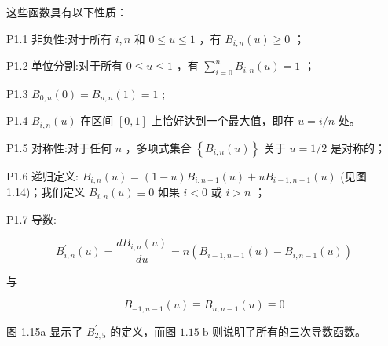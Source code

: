 \documentclass[../main.tex]{subfiles}
\begin{document}
这些函数具有以下性质：

P1.1 非负性:对于所有 \(i,n\) 和 \(0 \leq  u \leq  1\) ，有 \({B}_{i,n}\left( u\right)  \geq  0\) ；



P1.2 单位分割:对于所有 \(0 \leq  u \leq  1\) ，有 \(\mathop{\sum }\limits_{{i = 0}}^{n}{B}_{i,n}\left( u\right)  = 1\) ；

P1.3 \({B}_{0,n}\left( 0\right)  = {B}_{n,n}\left( 1\right)  = 1\) ;

P1.4 \({B}_{i,n}\left( u\right)\) 在区间 \(\left\lbrack  {0,1}\right\rbrack\) 上恰好达到一个最大值，即在 \(u = i/n\) 处。

P1.5 对称性:对于任何 \(n\) ，多项式集合 \(\left\{  {{B}_{i,n}\left( u\right) }\right\}\) 关于 \(u = 1/2\) 是对称的；



\noindent\begin{minipage}{\linewidth}
P1.6 递归定义: \({B}_{i,n}\left( u\right)  = \left( {1 - u}\right) {B}_{i,n - 1}\left( u\right)  + u{B}_{i - 1,n - 1}\left( u\right)\) (见图 1.14)；我们定义 \({B}_{i,n}\left( u\right)  \equiv  0\) 如果 \(i < 0\) 或 \(i > n\) ；

\begin{center}
\begin{minipage}{11cm}
\centering
{}
\captionsetup{font=small,skip=6pt,justification=centering}
\end{minipage}
\end{center}
\end{minipage}
\par\medskip

\noindent\begin{minipage}{\linewidth}
P1.7 导数:

\[
{B}_{i,n}^{\prime }\left( u\right)  = \frac{d{B}_{i,n}\left( u\right) }{du} = n\left( {{B}_{i - 1,n - 1}\left( u\right)  - {B}_{i,n - 1}\left( u\right) }\right)
\]

与

\[
{B}_{-1,n - 1}\left( u\right)  \equiv  {B}_{n,n - 1}\left( u\right)  \equiv  0
\]

图 1.15a 显示了 \({B}_{2,5}^{\prime }\) 的定义，而图 \({1.15}\mathrm{\;b}\) 则说明了所有的三次导数函数。

\begin{center}
\begin{minipage}{15.8cm}
\centering
{}
\captionsetup{font=small,skip=6pt,justification=centering}
\end{minipage}
\end{center}
\end{minipage}
\par\medskip
\end{document}
